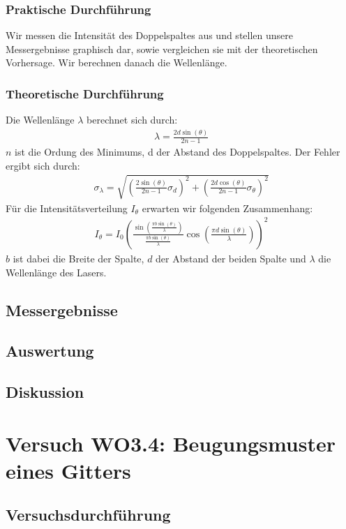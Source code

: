 \documentclass[12pt]{scrartcl}
\begin{document}
\subsubsection{Praktische Durchführung}
Wir messen die Intensität des Doppelspaltes aus und stellen unsere Messergebnisse graphisch dar, sowie vergleichen sie mit der theoretischen Vorhersage. Wir berechnen danach die Wellenlänge.
\subsubsection{Theoretische Durchführung}
Die Wellenlänge $\lambda$ berechnet sich durch:
\begin{align}
\lambda = \frac{2d \sin(\theta)}{2n-1}
\end{align}
$n$ ist die Ordung des Minimums, d der Abstand des Doppelspaltes.
Der Fehler ergibt sich durch:
\begin{align}
\sigma_\lambda = \sqrt{
\left(\frac{2 \sin(\theta)}{2n-1}\sigma_d\right)^2+
\left(\frac{2d \cos(\theta)}{2n-1}\sigma_\theta\right)^2}
\end{align}
Für die Intensitätsverteilung $I_\theta$ erwarten wir folgenden Zusammenhang:
\begin{align}
I_\theta = I_0\left(\frac{\sin\left(\frac{\pi b \sin(\theta)}{\lambda}\right)}{\frac{\pi b \sin(\theta)}{\lambda}}\cos\left(\frac{\pi d\sin(\theta)}{\lambda}\right)\right)^2
\end{align}
$b$ ist dabei die Breite der Spalte, $d$ der Abstand der beiden Spalte und $\lambda$ die Wellenlänge des Lasers.
\subsection{Messergebnisse}
\subsection{Auswertung}
\subsection{Diskussion}

\section{Versuch WO3.4: Beugungsmuster eines Gitters}
\subsection{Versuchsdurchführung}
\end{document}
